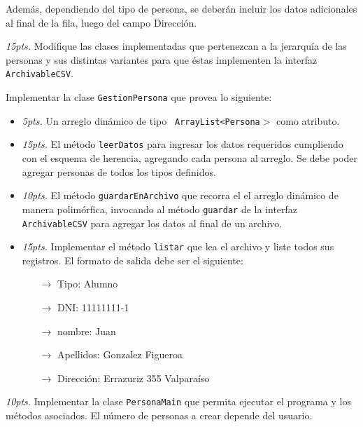 \documentclass{exam}
\begin{document}
\begin{questions}
\begin{itemize}
    \noindent
    Además, dependiendo del tipo de persona, se deberán incluir los
    datos adicionales al final de la fila, luego del campo Dirección.
    
  \end{itemize}

\item \emph{15pts. } Modifique las clases implementadas que
  pertenezcan a la jerarquía de las personas y sus distintas variantes
  para que éstas implementen la interfaz {\tt ArchivableCSV}.

\item Implementar la clase {\tt GestionPersona} que provea lo
  siguiente:
  \begin{itemize}
    
  \item \emph{5pts.} Un arreglo dinámico de tipo {\tt
      ArrayList<Persona}{\tt $>$} como atributo.
    
  \item \emph{15pts.} El método {\tt leerDatos} para ingresar los
    datos requeridos cumpliendo con el esquema de herencia, agregando
    cada persona al arreglo. Se debe poder agregar personas de todos
    los tipos definidos.
    
  \item \emph{10pts.} El método {\tt guardarEnArchivo} que recorra el
    el arreglo dinámico de manera polimórfica, invocando al método
    {\tt guardar} de la interfaz {\tt ArchivableCSV} para agregar los
    datos al final de un archivo.
                             
  \item \emph{15pts.} Implementar el método {\tt listar} que lea el
    archivo y liste todos sus registros. El formato de salida debe ser
    el siguiente:
    
    \begin{itemize}
    \item[$\rightarrow$] Tipo: Alumno
    \item[$\rightarrow$] DNI: 11111111-1
    \item[$\rightarrow$] nombre: Juan
    \item[$\rightarrow$] Apellidos: Gonzalez Figueroa
    \item[$\rightarrow$] Dirección: Errazuriz 355 Valparaíso
    \end{itemize}
    
    \end{itemize}
  \item \emph{10pts.} Implementar la clase {\tt PersonaMain} que
    permita ejecutar el programa y los métodos asociados. El número de
    personas a crear depende del usuario.
        
\end{questions}
\end{document}
